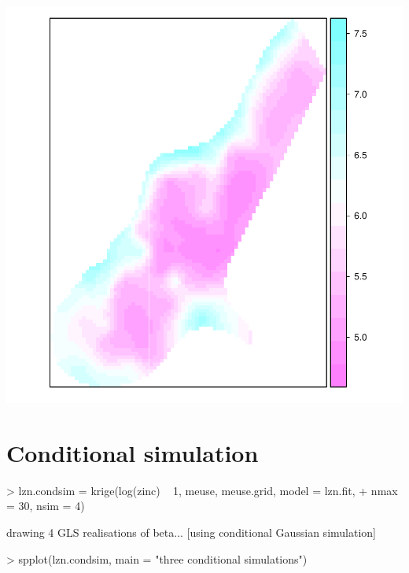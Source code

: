 \documentclass[a4paper]{article}
\begin{document}
\includegraphics{gstat-011}

\section{Conditional simulation}
\begin{Schunk}
\begin{Sinput}
> lzn.condsim = krige(log(zinc) ~ 1, meuse, meuse.grid, model = lzn.fit, 
+     nmax = 30, nsim = 4)
\end{Sinput}
\begin{Soutput}
drawing 4 GLS realisations of beta...
[using conditional Gaussian simulation]
\end{Soutput}
\begin{Sinput}
> spplot(lzn.condsim, main = "three conditional simulations")
\end{Sinput}
\end{Schunk}
\end{document}
